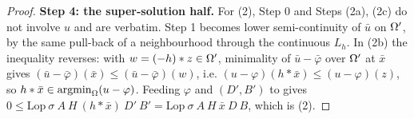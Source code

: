 \begin{proof}
\medskip\noindent\textbf{Step 4: the super-solution half.} For (2), Step 0 and Steps (2a),
(2c) do not involve $u$ and are verbatim. Step 1 becomes lower semi-continuity of $\bar u$
on $\Omega'$, by the same pull-back of a neighbourhood through the continuous $L_h$. In (2b)
the inequality reverses: with $w=(-h)*z\in\Omega'$, minimality of $\bar u-\bar\varphi$ over
$\Omega'$ at $\bar x$ gives $(\bar u-\bar\varphi)(\bar x)\le(\bar u-\bar\varphi)(w)$, i.e.
$(u-\varphi)(h*\bar x)\le(u-\varphi)(z)$, so $h*\bar x\in\operatorname*{argmin}_\Omega(u-\varphi)$. Feeding
$\varphi$ and $(D',B')$ to  gives
$0\le\mathrm{Lop}\ \sigma\ A\ H\ (h*\bar x)\ D'\ B'=\mathrm{Lop}\ \sigma\ A\ H\ \bar x\ D\ B$,
which is (2).
\end{proof}
